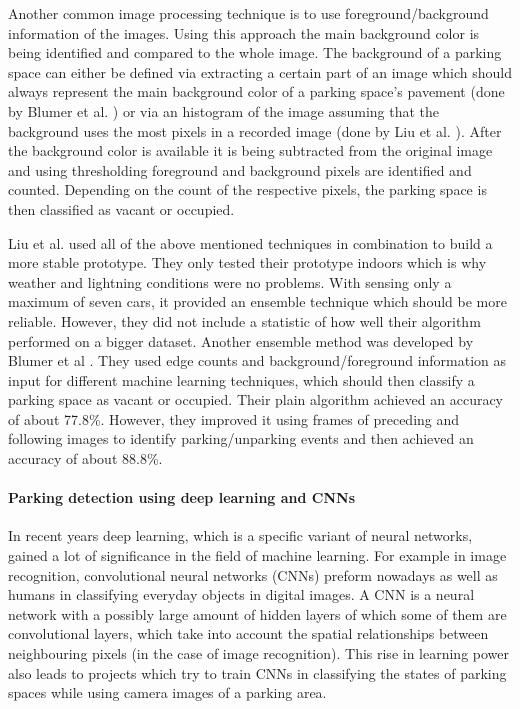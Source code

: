 Another common image processing technique is to use foreground/background information of the images. Using this approach the main background color is being identified and compared to the whole image. The background of a parking space can either be defined via extracting a certain part of an image which should always represent the main background color of a parking space's pavement (done by Blumer et al. \cite{Blumer2012}) or via an histogram of the image assuming that the background uses the most pixels in a recorded image (done by Liu et al. \cite{stationary_camera_sensing}). After the background color is available it is being subtracted from the original image and using thresholding foreground and background pixels are identified and counted. Depending on the count of the respective pixels, the parking space is then classified as vacant or occupied.

Liu et al. \cite{stationary_camera_sensing} used all of the above mentioned techniques in combination to build a more stable prototype. They only tested their prototype indoors which is why weather and lightning conditions were no problems. With sensing only a maximum of seven cars, it provided an ensemble technique which should be more reliable. However, they did not include a statistic of how well their algorithm performed on a bigger dataset. Another ensemble method was developed by Blumer et al \cite{Blumer2012}. They used edge counts and background/foreground information as input for different machine learning techniques, which should then classify a parking space as vacant or occupied. Their plain algorithm achieved an accuracy of about 77.8\%. However, they improved it using frames of preceding and following images to identify parking/unparking events and then achieved an accuracy of about 88.8\%.


\paragraph{Parking detection using deep learning and CNNs}

In recent years deep learning, which is a specific variant of neural networks, gained a lot of significance in the field of machine learning. For example in image recognition, convolutional neural networks (CNNs) preform nowadays as well as humans in classifying everyday objects in digital images. A CNN is a neural network with a possibly large amount of hidden layers of which some of them are convolutional layers, which take into account the spatial relationships between neighbouring pixels (in the case of image recognition). This rise in learning power also leads to projects which try to train CNNs in classifying the states of parking spaces while using camera images of a parking area.

